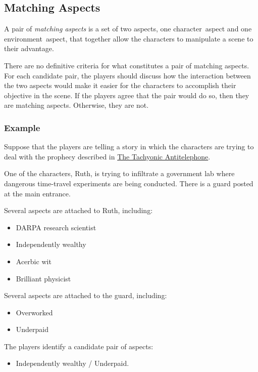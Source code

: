 \documentclass[12pt, a5paper, parskip=half-]{scrartcl}
\begin{document}
\newpage

\subsection*{Matching Aspects} \label{subsection:matching-aspects}
A pair of \emph{matching aspects} is a set of two aspects, one character~aspect and one environment~aspect, that together allow the characters to manipulate a scene to their advantage.

There are no definitive criteria for what constitutes a pair of matching aspects. 
For each candidate pair, the players should discuss how the interaction between the two aspects would make it easier for the characters to accomplish their objective in the scene. If the players agree that the pair would do so, then they are matching aspects. Otherwise, they are not.

\subsubsection*{Example} \label{example:matching-aspects}
Suppose that the players are telling a story in which the characters are trying to deal with the prophecy described in \hyperref[subsection:the-tachyonic-antitelephone]{\cinzel \small The Tachyonic Antitelephone}. 

One of the characters, Ruth,  is trying to infiltrate a government lab where dangerous time-travel experiments are being conducted.  There is a guard posted at the main entrance.

Several aspects are attached to Ruth, including:\vspace{-1.75ex}
\begin{multicols}{2}
\begin{itemize}[noitemsep,nolistsep,  leftmargin=0.68cm]
  \item DARPA research scientist
  \item Independently wealthy
  \item Acerbic wit
  \item Brilliant physicist
\end{itemize}
\end{multicols}
\vspace{-2ex}
Several aspects are attached to the guard, including:\vspace{-1.75ex}
\begin{multicols}{2}
\begin{itemize}[noitemsep,nolistsep,  leftmargin=0.68cm]
	\item Overworked
	\item Underpaid
\end{itemize}
\end{multicols}
\vspace{-2ex}
The players identify a candidate pair of aspects:
\begin{itemize}[leftmargin=0.68cm, noitemsep,topsep=-1ex]
	\item Independently wealthy / Underpaid.
\end{itemize}
\vspace{1ex}
\end{document}
